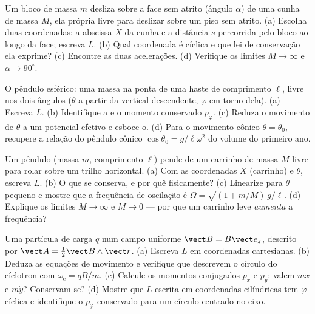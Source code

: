 \begin{exercise}[$\star\star$]\label{exo:b3:lagrangian-mechanics:5}
Um bloco de massa $m$ desliza sobre a face sem atrito (ângulo $\alpha$)
de uma cunha de massa $M$, ela própria livre para deslizar sobre um
piso sem atrito. (a) Escolha duas coordenadas: a abscissa $X$ da cunha
e a distância $s$ percorrida pelo bloco ao longo da face; escreva $L$.
(b) Qual coordenada é cíclica e que lei de conservação ela exprime?
(c) Encontre as duas acelerações. (d) Verifique os limites
$M \to \infty$ e $\alpha \to
90^\circ$.
\end{exercise}

\begin{exercise}[$\star\star$]\label{exo:b3:lagrangian-mechanics:6}
O pêndulo esférico: uma massa na ponta de uma haste de comprimento
$\ell$, livre nos dois ângulos ($\theta$ a partir da vertical
descendente, $\varphi$ em torno dela). (a) Escreva $L$. (b) Identifique
a  e o momento conservado $p_\varphi$. (c) Reduza o
movimento de $\theta$ a um potencial efetivo e esboce-o. (d) Para o
movimento cônico $\theta =
\theta_0$, recupere a relação do pêndulo cônico $\cos\theta_0 =
g/\ell\omega^2$ do volume do primeiro ano.
\end{exercise}

\begin{exercise}[$\star\star$]\label{exo:b3:lagrangian-mechanics:7}
Um pêndulo (massa $m$, comprimento $\ell$) pende de um carrinho de
massa $M$ livre para rolar sobre um trilho horizontal. (a) Com as
coordenadas $X$ (carrinho) e $\theta$, escreva $L$. (b) O que se
conserva, e por quê fisicamente? (c) Linearize para $\theta$ pequeno e
mostre que a frequência de oscilação é
$\Omega = \sqrt{(1 + m/M)\,g/\ell}$. (d) Explique os limites $M \to
\infty$ e $M \to 0$ --- por que um carrinho leve \emph{aumenta} a
frequência?
\end{exercise}

\begin{exercise}[$\star\star$]\label{exo:b3:lagrangian-mechanics:8}
Uma partícula de carga $q$ num campo uniforme $\vect B = B\vect e_z$,
descrito por $\vect A = \tfrac12\vect B\wedge\vect r$. (a) Escreva $L$
em coordenadas cartesianas. (b) Deduza as equações de movimento e
verifique que descrevem o círculo do cíclotron com
$\omega_{\text{c}} = qB/m$. (c) Calcule os momentos conjugados $p_x$ e
$p_y$: valem $m\dot x$ e $m\dot y$? Conservam-se? (d) Mostre que $L$
escrita em coordenadas cilíndricas tem $\varphi$ cíclica e identifique
o $p_\varphi$ conservado para um círculo centrado no eixo.
\end{exercise}

